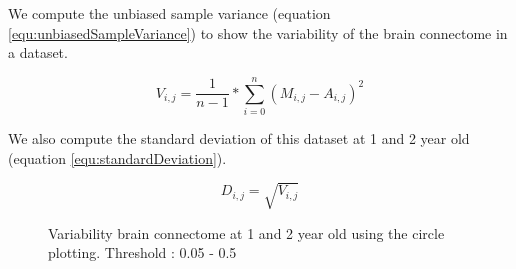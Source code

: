 \documentclass[]{spie}  %
\begin{document}
We compute the unbiased sample variance  (equation \ref{equ:unbiasedSampleVariance}) to show the variability of the brain connectome in a dataset. 

\begin{equation}
	V_{i,j} = \frac{1}{n-1} * \sum_{i=0}^n {(M_{i,j} - A_{i,j})^2}
	\label{equ:unbiasedSampleVariance}
\end{equation}

We also compute the standard deviation of this dataset at 1 and 2 year old (equation \ref{equ:standardDeviation}).

\begin{equation}
	D_{i,j} = \sqrt{V_{i,j}}
	\label{equ:standardDeviation}
\end{equation}

\begin{figure}
\centering 
{}
\caption[Variability of brain connectome at 1 (a) and 2 (a) year old using the circle plotting ]{Variability brain connectome at 1 and 2 year old using the circle plotting. Threshold : 0.05 - 0.5 }
\label{fig:VariabilityBrainConnectome}
\end{figure} 
\end{document}

